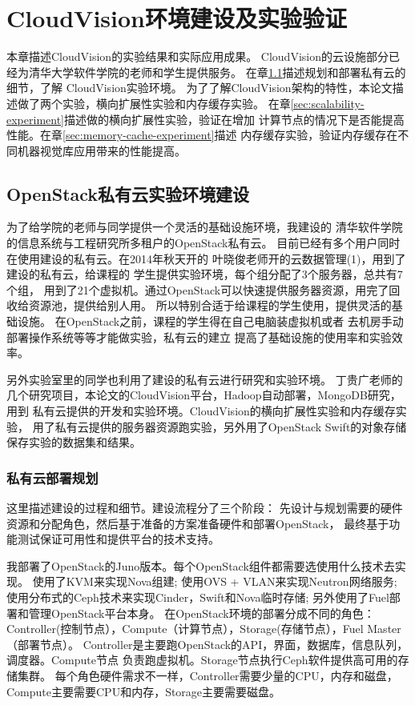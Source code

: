 \chapter{CloudVision环境建设及实验验证}
\label{cha:cloudvision_experiment}
本章描述CloudVision的实验结果和实际应用成果。
CloudVision的云设施部分已经为清华大学软件学院的老师和学生提供服务。
在章\ref{sec:priv-cloud-deployment}描述规划和部署私有云的细节，了解
CloudVision实验环境。
为了了解CloudVision架构的特性，本论文描述做了两个实验，横向扩展性实验和内存缓存实验。
在章\ref{sec:scalability-experiment}描述做的横向扩展性实验，验证在增加
计算节点的情况下是否能提高性能。在章\ref{sec:memory-cache-experiment}描述
内存缓存实验，验证内存缓存在不同机器视觉库应用带来的性能提高。


\section{OpenStack私有云实验环境建设}
\label{sec:priv-cloud-deployment}
为了给学院的老师与同学提供一个灵活的基础设施环境，我建设的
清华软件学院的信息系统与工程研究所多租户的OpenStack私有云。
目前已经有多个用户同时在使用建设的私有云。在2014年秋天开的
叶晓俊老师开的云数据管理(1)，用到了建设的私有云，给课程的
学生提供实验环境，每个组分配了3个服务器，总共有7个组，
用到了21个虚拟机。通过OpenStack可以快速提供服务器资源，用完了回收给资源池，提供给别人用。
所以特别合适于给课程的学生使用，提供灵活的基础设施。
在OpenStack之前，课程的学生得在自己电脑装虚拟机或者
去机房手动部署操作系统等等才能做实验，私有云的建立
提高了基础设施的使用率和实验效率。

另外实验室里的同学也利用了建设的私有云进行研究和实验环境。
丁贵广老师的几个研究项目，本论文的CloudVision平台，Hadoop自动部署，MongoDB研究，用到
私有云提供的开发和实验环境。CloudVision的横向扩展性实验和内存缓存实验，
用了私有云提供的服务器资源跑实验，另外用了OpenStack Swift的对象存储
保存实验的数据集和结果。

\subsection{私有云部署规划}
这里描述建设的过程和细节。建设流程分了三个阶段：
先设计与规划需要的硬件资源和分配角色，然后基于准备的方案准备硬件和部署OpenStack，
最终基于功能测试保证可用性和提供平台的技术支持。

我部署了OpenStack的Juno版本。每个OpenStack组件都需要选使用什么技术去实现。
使用了KVM来实现Nova组建;
使用OVS + VLAN来实现Neutron网络服务;
使用分布式的Ceph技术来实现Cinder，Swift和Nova临时存储;
另外使用了Fuel部署和管理OpenStack平台本身。
在OpenStack环境的部署分成不同的角色：Controller(控制节点），Compute（计算节点），Storage(存储节点），Fuel Master（部署节点）。
Controller是主要跑OpenStack的API，界面，数据库，信息队列，调度器。Compute节点
负责跑虚拟机。Storage节点执行Ceph软件提供高可用的存储集群。
每个角色硬件需求不一样，Controller需要少量的CPU，内存和磁盘，
Compute主要需要CPU和内存，Storage主要需要磁盘。

